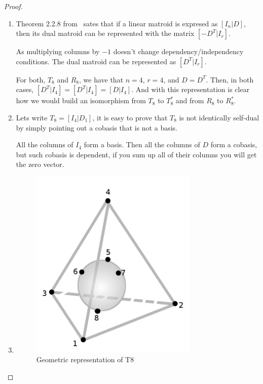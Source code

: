 \begin{proof}$\,$\pn
    \begin{enumerate}[label=(\roman*)]
        \item 
        
            Theorem 2.2.8 from~\cite{Oxley} sates that if a linear matroid is expresed as $[I_n | D]$,
            then its dual matroid can be represented with the matrix $[-D^T | I_r]$.\pn
            
            As multiplying columns by $-1$ doesn't change dependency/independency conditions. The dual matroid can be represented
            as $[D^T | I_r]$.\pn
            
            For both, $T_8$ and $R_8$, we have that $n = 4$, $r = 4$, and $D = D^T$. Then, in both cases, 
            $[D^T | I_4] = [D^T | I_4] = [D | I_4]$. And with this representation is clear how we would build an
            isomorphism from $T_8$ to $T_8^*$ and from $R_8$ to $R_8^*$.
            
        \item
            Lets write $T_8 = [I_4 | D_1]$, it is easy to prove that $T_8$ is not identically self-dual by
            simply pointing out a cobasis that is not a basis.\pn
            
            All the columns of $I_4$ form a basis. Then all the columns of $D$ form a cobasis, but such cobasis is
            dependent, if you sum up all of their columns you will get the zero vector.\pn
        
        \item
            \begin{figure}[H]
                \begin{center}
                    \includegraphics[width=8cm]{Test2/Problem7/T8GraphicRepresentation.png}
                \end{center}                            
                \caption{Geometric representation of T8}
                \label{t2:p7_T8GraphicRepresentation.png}                        
            \end{figure}\pn 
            

\end{enumerate}
\end{proof}
